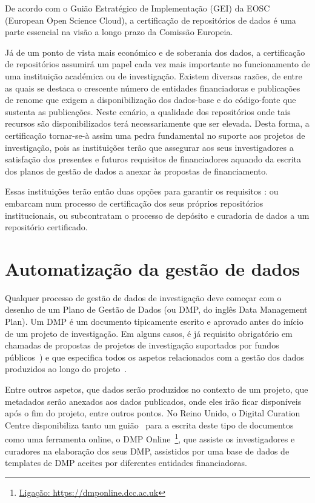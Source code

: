 \documentclass[sigconf,nonacm]{acmart}
\begin{document}
De acordo com o Guião Estratégico de Implementação (GEI) da EOSC (European Open Science Cloud), a certificação de repositórios de dados é uma parte essencial na visão a longo prazo da Comissão Europeia. 

Já de um ponto de vista mais económico e de soberania dos dados, a certificação de repositórios assumirá um papel cada vez mais importante no funcionamento de uma instituição académica ou de investigação. Existem diversas razões, de entre as quais se destaca o crescente número de entidades financiadoras e publicações de renome que exigem a disponibilização dos dados-base e do código-fonte que sustenta as publicações. Neste cenário, a qualidade dos repositórios onde tais recursos são disponibilizados terá necessariamente que ser elevada. Desta forma, a certificação tornar-se-à assim uma pedra fundamental no suporte aos projetos de investigação, pois as instituições terão que assegurar aos seus investigadores a satisfação dos presentes e futuros requisitos de financiadores aquando da escrita dos planos de gestão de dados a anexar às propostas de financiamento.

Essas instituições terão então duas opções para garantir os requisitos : ou embarcam num processo de certificação dos seus próprios repositórios institucionais, ou subcontratam o processo de depósito e curadoria de dados a um repositório certificado. 

\section{Automatização da gestão de dados}

Qualquer processo de gestão de dados de investigação deve começar com o desenho de um Plano de Gestão de Dados (ou DMP, do inglês Data Management Plan). Um DMP é um documento tipicamente escrito e aprovado antes do início de um projeto de investigação. Em alguns casos, é já requisito obrigatório em chamadas de propostas de projetos de investigação suportados por fundos públicos~\cite{Foundation2011}) e que especifica todos os aspetos relacionados com a gestão dos dados produzidos ao longo do projeto~\cite{}. 

Entre outros aspetos, que dados serão produzidos no contexto de um projeto, que metadados serão anexados aos dados publicados, onde eles irão ficar disponíveis após o fim do projeto, entre outros pontos. No Reino Unido, o Digital Curation Centre disponibiliza tanto um guião~\cite{jones_dmp} para a escrita deste tipo de documentos como uma ferramenta online, o DMP Online~\footnote{\url{Ligação: https://dmponline.dcc.ac.uk}}, que assiste os investigadores e curadores na elaboração dos seus DMP, assistidos por uma base de dados de templates de DMP aceites por diferentes entidades financiadoras.
\end{document}
